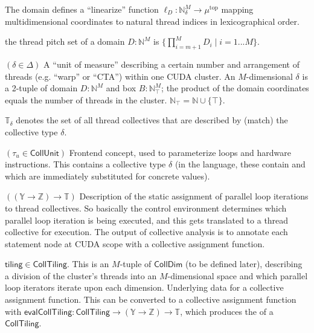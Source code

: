 The domain defines a ``linearize'' function $\ell_D: \mathbb{N}^M_\delta \to \mu^\text{top}$ mapping multidimensional coordinates to natural thread indices in lexicographical order.

\filbreak
{} the thread pitch set of a domain $D: \mathbb{N}^M$ is $\{ \prod_{i=m+1}^M D_i \mid i = 1 ... M \}$.

\filbreak
{} $(\delta \in \Delta)$ A ``unit of measure'' describing a certain number and arrangement of threads (e.g. ``warp'' or ``CTA'') within one CUDA cluster.
An $M$-dimensional $\delta$ is a 2-tuple of domain $D: \mathbb{N}^M$ and box $B: \mathbb{N}_\top^M$; the product of the domain coordinates equals the number of threads in the cluster.
$\mathbb{N}_\top = \mathbb{N} \cup \{\top\}$.

$\mathbb{T}_\delta$ denotes the set of all thread collectives that are described by (match) the collective type $\delta$.

\filbreak
{} $(\tau_u \in \mathsf{CollUnit})$
Frontend concept, used to parameterize  loops and hardware instructions.
This contains a collective type $\delta$ (in the language, these contain  and  which are immediately substituted for concrete values).

\filbreak
{} $((\mathbb{Y} \to \mathbb{Z}) \to \mathbb{T})$
Description of the static assignment of parallel loop iterations to thread collectives.
So basically the control environment determines which parallel loop iteration is being executed, and this gets translated to a thread collective for execution.
The output of collective analysis is to annotate each statement node at CUDA scope with a collective assignment function.

\filbreak
{} $\mathsf{tiling} \in \mathsf{CollTiling}$.
This is an $M$-tuple of $\mathsf{CollDim}$ (to be defined later), describing a division of the cluster's threads into an $M$-dimensional space and which parallel loop iterators iterate upon each dimension.
Underlying data for a collective assignment function.
This can be converted to a collective assignment function with $\mathsf{evalCollTiling}: \mathsf{CollTiling} \to (\mathbb{Y} \to \mathbb{Z}) \to \mathbb{T}$,
which produces the  of a $\mathsf{CollTiling}$.


\filbreak
{}


